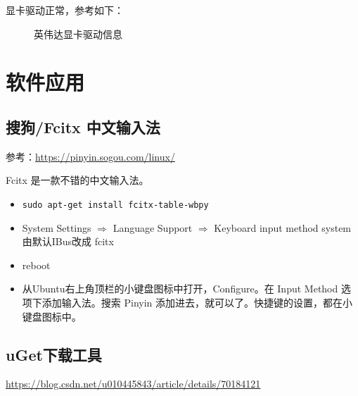显卡驱动正常，参考如下：
\begin{figure}[h!]
\centering
{}
\caption{英伟达显卡驱动信息}
\end{figure}







\chapter{软件应用}
\section{搜狗/Fcitx 中文输入法}
参考：\url{https://pinyin.sogou.com/linux/}

Fcitx 是一款不错的中文输入法。
\begin{itemize}
\item \verb|sudo apt-get install fcitx-table-wbpy|

\item System Settings $\Longrightarrow$ Language Support $\Longrightarrow$
Keyboard input method system 由默认IBus改成 fcitx

\item reboot

\item 从Ubuntu右上角顶栏的小键盘图标中打开，Configure。在 Input Method 选项下添加输入法。搜索 Pinyin 添加进去，就可以了。快捷键的设置，都在小键盘图标中。
\end{itemize}



\section{uGet下载工具}
\url{https://blog.csdn.net/u010445843/article/details/70184121}

